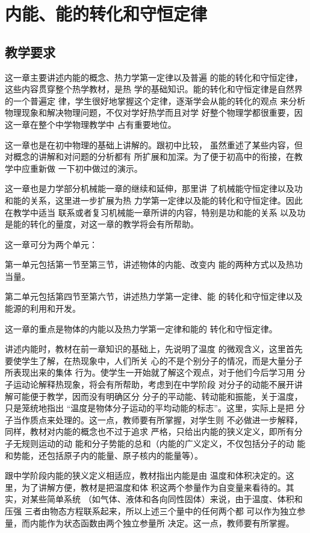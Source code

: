 \chapter{内能、能的转化和守恒定律}
\section{教学要求}
这一章主要讲述内能的概念、热力学第一定律以及普遍
的能的转化和守恒定律，这些内容贯穿整个热学教材，是热
学的基础知识。能的转化和守恒定律是自然界的一个普遍定
律，学生很好地掌握这个定律，逐渐学会从能的转化的观点
来分析物理现象和解决物理问题，不仅对学好热学而且对学
好整个物理学都很重要，因这一章在整个中学物理教学中
占有重要地位。

这一章也是在初中物理的基础上讲解的。跟初中比较，
虽然重述了某些内容，但对概念的讲解和对问题的分析都有
所扩展和加深。为了便于初高中的衔接，在教学中应重新做
一下初中做过的演示。

这一章也是力学部分机械能一章的继续和延伸，那里讲
了机械能守恒定律以及功和能的关系，这里进一步扩展为热
力学第一定律以及能的转化和守恒定律。因此在教学中适当
联系或者复习机械能一章所讲的内容，特别是功和能的关系
以及功是能的转化的量度，对这一章的教学将会有所帮助。

这一章可分为两个单元：

第一单元包括第一节至第三节，讲述物体的内能、改变内
能的两种方式以及热功当量。

第二单元包括第四节至第六节，讲述热力学第一定律、能
的转化和守恒定律以及能源的利用和开发。

这一章的重点是物体的内能以及热力学第一定律和能的
转化和守恒定律。

讲述内能时，教材在前一章知识的基础上，先说明了温度
的微观含义，这里首先要使学生了解，在热现象中，人们所关
心的不是个别分子的情况，而是大量分子所表现出来的集体
行为。使学生一开始就了解这个观点，对于他们今后学习用
分子运动论解释热现象，将会有所帮助，考虑到在中学阶段
对分子的动能不展开讲解可能便于教学，因而没有明确区分
分子的平动能、转动能和振能，关于温度，只是笼统地指出
“温度是物体分子运动的平均动能的标志”。这里，实际上是把
分子当作质点来处理的。这一点，教师要有所掌握，对学生则
不必做进一步解释，同样，教材对内能的概念也不过于追求
严格，只给出内能的狭义定义，即所有分子无规则运动的动
能和分子势能的总和（内能的广义定义，不仅包括分子的动
能和势能，还包括原子内的能量、原子核内的能量等）。

跟中学阶段内能的狭义定义相适应，教材指出内能是由
温度和体积决定的。这里，为了讲解方便，教材是把温度和体
积这两个参量作为自变量来看待的。其实，对某些简单系统
（如气体、液体和各向同性固体）来说，由于温度、体积和压强
三者由物态方程联系起来，所以上述三个量中的任何两个都
可以作为独立参量，而内能作为状态函数由两个独立参量所
决定。这一点，教师要有所掌握。

